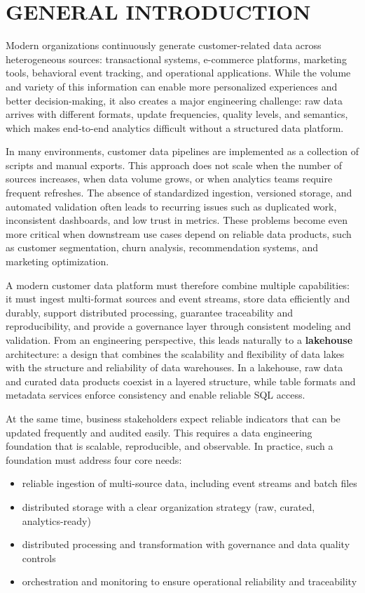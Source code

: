 \chapter*{GENERAL INTRODUCTION}

Modern organizations continuously generate customer-related data across heterogeneous sources: transactional systems, e-commerce platforms, marketing tools, behavioral event tracking, and operational applications. While the volume and variety of this information can enable more personalized experiences and better decision-making, it also creates a major engineering challenge: raw data arrives with different formats, update frequencies, quality levels, and semantics, which makes end-to-end analytics difficult without a structured data platform.

In many environments, customer data pipelines are implemented as a collection of scripts and manual exports. This approach does not scale when the number of sources increases, when data volume grows, or when analytics teams require frequent refreshes. The absence of standardized ingestion, versioned storage, and automated validation often leads to recurring issues such as duplicated work, inconsistent dashboards, and low trust in metrics. These problems become even more critical when downstream use cases depend on reliable data products, such as customer segmentation, churn analysis, recommendation systems, and marketing optimization.

A modern customer data platform must therefore combine multiple capabilities: it must ingest multi-format sources and event streams, store data efficiently and durably, support distributed processing, guarantee traceability and reproducibility, and provide a governance layer through consistent modeling and validation. From an engineering perspective, this leads naturally to a \textbf{lakehouse} architecture: a design that combines the scalability and flexibility of data lakes with the structure and reliability of data warehouses. In a lakehouse, raw data and curated data products coexist in a layered structure, while table formats and metadata services enforce consistency and enable reliable SQL access.

At the same time, business stakeholders expect reliable indicators that can be updated frequently and audited easily. This requires a data engineering foundation that is scalable, reproducible, and observable. In practice, such a foundation must address four core needs:
\begin{itemize}
    \item reliable ingestion of multi-source data, including event streams and batch files
    \item distributed storage with a clear organization strategy (raw, curated, analytics-ready)
    \item distributed processing and transformation with governance and data quality controls
    \item orchestration and monitoring to ensure operational reliability and traceability
\end{itemize}

